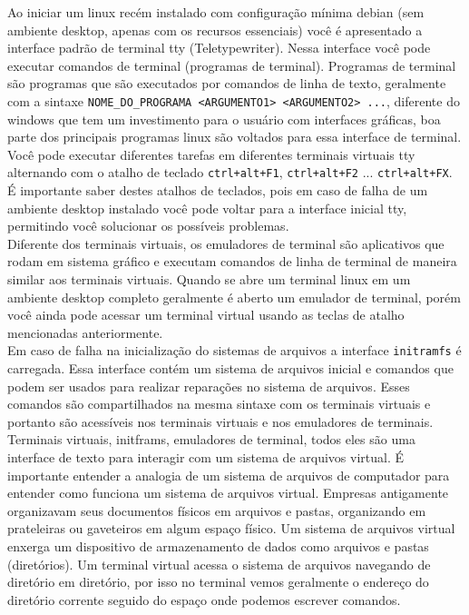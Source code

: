 \documentclass[12pt,a4paper]{article}
\begin{document}
\vspace{\baselineskip}

Ao iniciar um linux recém instalado com configuração mínima debian (sem ambiente desktop, apenas com os recursos essenciais) você é apresentado a interface padrão de terminal tty (Teletypewriter). Nessa interface você pode executar comandos de terminal (programas de terminal). Programas de terminal são programas que são executados por comandos de linha de texto, geralmente com a sintaxe \texttt{NOME\_DO\_PROGRAMA <ARGUMENTO1> <ARGUMENTO2> ...}, diferente do windows que tem um investimento para o usuário com interfaces gráficas, boa parte dos principais programas linux são voltados para essa interface de terminal. \\

Você pode executar diferentes tarefas em diferentes terminais virtuais tty alternando com o atalho de teclado \texttt{ctrl+alt+F1}, \texttt{ctrl+alt+F2} ... \texttt{ctrl+alt+FX}. É importante saber destes atalhos de teclados, pois em caso de falha de um ambiente desktop instalado você pode voltar para a interface inicial tty, permitindo você solucionar os possíveis problemas.\\

Diferente dos terminais virtuais, os emuladores de terminal são aplicativos que rodam em sistema gráfico e executam comandos de linha de terminal de maneira similar aos terminais virtuais. Quando se abre um terminal linux em um ambiente desktop completo geralmente é aberto um emulador de terminal, porém você ainda pode acessar um terminal virtual usando as teclas de atalho mencionadas anteriormente. \\ 

Em caso de falha na inicialização do sistemas de arquivos a interface \texttt{initramfs} é carregada. Essa interface contém um sistema de arquivos inicial e comandos que podem ser usados para realizar reparações no sistema de arquivos. Esses comandos são compartilhados na mesma sintaxe com os terminais virtuais e portanto são acessíveis nos terminais virtuais e nos emuladores de terminais. \\

Terminais virtuais, initframs, emuladores de terminal, todos eles são uma interface de texto para interagir com um sistema de arquivos virtual. É importante entender a analogia de um sistema de arquivos de computador para entender como funciona um sistema de arquivos virtual. Empresas antigamente organizavam seus documentos físicos em arquivos e pastas, organizando em prateleiras ou gaveteiros em algum espaço físico. Um sistema de arquivos virtual enxerga um dispositivo de armazenamento de dados como arquivos e pastas (diretórios). Um terminal virtual acessa o sistema de arquivos navegando de diretório em diretório, por isso no terminal vemos geralmente o endereço do diretório corrente seguido do espaço onde podemos escrever comandos.
\end{document}
